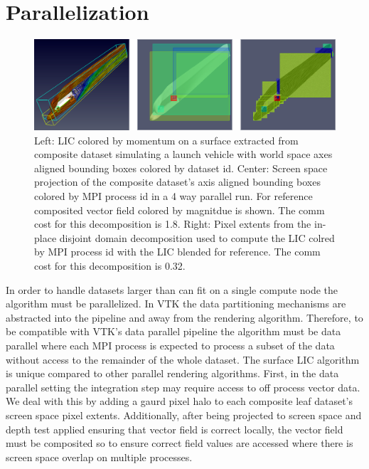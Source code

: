\documentclass[a4paper,10pt]{article}
\begin{document}
\section{Parallelization}
\begin{figure}[ht]
 \centering
 \includegraphics[width=\textwidth]{./images-data/dia-serial/shuttle-surf-par-lg-p-d-space-lic.png}
 \caption{Left: LIC colored by momentum on a surface extracted from composite dataset simulating a launch vehicle\cite{nasa-shuttle} with world space axes aligned bounding boxes colored by dataset id. Center: Screen space projection of the composite dataset's axis aligned bounding boxes colored by MPI process id in a 4 way parallel run. For reference composited vector field colored by magnitdue is shown. The comm cost for this decomposition is 1.8. Right: Pixel extents from the in-place disjoint domain decomposition used to compute the LIC colred by MPI process id with the LIC blended for reference. The comm cost for this decomposition is 0.32.}
 \label{fig:blocks}
\end{figure}
In order to handle datasets larger than can fit on a single compute node the algorithm must be parallelized. In VTK the data partitioning mechanisms are abstracted into the pipeline and away from the rendering algorithm. Therefore, to be compatible with VTK's data parallel pipeline the algorithm must be data parallel where each MPI process is expected to process a subset of the data without access to the remainder of the whole dataset. The surface LIC algorithm is unique compared to other parallel rendering algorithms. First, in the data parallel setting the integration step may require access to off process vector data. We deal with this by adding a gaurd pixel halo to each composite leaf dataset's screen space pixel extents. Additionally, after being projected to screen space and depth test applied ensuring that vector field is correct locally, the vector field must be composited so to ensure correct field values are accessed where there is screen space overlap on multiple processes. 
\end{document}
